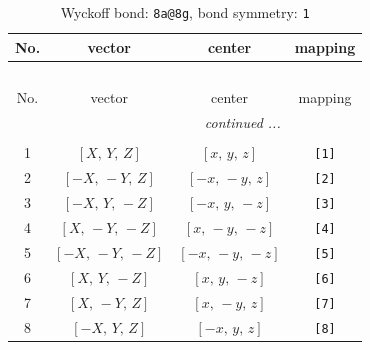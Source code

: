 \documentclass[fleqn,8pt]{jsarticle}
\begin{document}
\begin{longtable}{cccc}
\caption{Wyckoff bond: {\tt 8a@8g}, bond symmetry: {\tt 1}}
 \\
 \hline \hline
No. & vector & center & mapping \\ \hline \endfirsthead

\multicolumn{3}{l}{\tablename\ \thetable{}} \\
 \hline \hline
No. & vector & center & mapping \\ \hline \endhead

 \hline \hline
\multicolumn{3}{r}{\footnotesize\it continued ...} \\ \endfoot

 \hline \hline
\multicolumn{3}{r}{} \\ \endlastfoot

1 & $\left[ X,\, Y,\, Z \right]$ & $\left[ x,\, y,\, z \right]$ & {\tt [1]} \\ \hline
2 & $\left[ - X,\, - Y,\, Z \right]$ & $\left[ - x,\, - y,\, z \right]$ & {\tt [2]} \\ \hline
3 & $\left[ - X,\, Y,\, - Z \right]$ & $\left[ - x,\, y,\, - z \right]$ & {\tt [3]} \\ \hline
4 & $\left[ X,\, - Y,\, - Z \right]$ & $\left[ x,\, - y,\, - z \right]$ & {\tt [4]} \\ \hline
5 & $\left[ - X,\, - Y,\, - Z \right]$ & $\left[ - x,\, - y,\, - z \right]$ & {\tt [5]} \\ \hline
6 & $\left[ X,\, Y,\, - Z \right]$ & $\left[ x,\, y,\, - z \right]$ & {\tt [6]} \\ \hline
7 & $\left[ X,\, - Y,\, Z \right]$ & $\left[ x,\, - y,\, z \right]$ & {\tt [7]} \\ \hline
8 & $\left[ - X,\, Y,\, Z \right]$ & $\left[ - x,\, y,\, z \right]$ & {\tt [8]} \\
\end{longtable}
\end{document}
